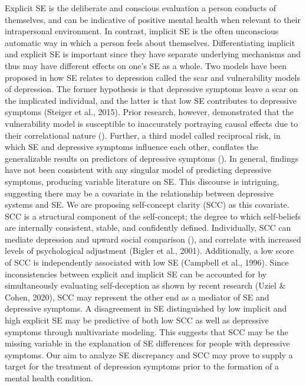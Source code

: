 \documentclass[
  man,
  floatsintext,
  longtable,
  nolmodern,
  notxfonts,
  notimes,
  colorlinks=true,linkcolor=blue,citecolor=blue,urlcolor=blue]{apa7}
\begin{document}
Explicit SE is the deliberate and conscious evaluation a person conducts
of themselves, and can be indicative of positive mental health when
relevant to their intrapersonal environment. In contrast, implicit SE is
the often unconscious automatic way in which a person feels about
themselves. Differentiating implicit and explicit SE is important since
they have separate underlying mechanisms and thus may have different
effects on one's SE as a whole. Two models have been proposed in how SE
relates to depression called the scar and vulnerability models of
depression. The former hypothesis is that depressive symptoms leave a
scar on the implicated individual, and the latter is that low SE
contributes to depressive symptoms (Steiger et al., 2015). Prior
research, however, demonstrated that the vulnerability model is
susceptible to inaccurately portraying causal effects due to their
correlational nature (). Further, a third model called reciprocal risk, in which SE and
depressive symptoms influence each other, conflates the generalizable
results on predictors of depressive symptoms
(). In
general, findings have not been consistent with any singular model of
predicting depressive symptoms, producing variable literature on SE.
This discourse is intriguing, suggesting there may be a covariate in the
relationship between depressive systems and SE. We are proposing
self-concept clarity (SCC) as this covariate. SCC is a structural
component of the self-concept; the degree to which self-beliefs are
internally consistent, stable, and confidently defined. Individually,
SCC can mediate depression and upward social comparison
(), and
correlate with increased levels of psychological adjustment (Bigler et
al., 2001). Additionally, a low score of SCC is independently associated
with low SE (Campbell et al., 1996). Since inconsistencies between
explicit and implicit SE can be accounted for by simultaneously
evaluating self-deception as shown by recent research (Uziel \& Cohen,
2020), SCC may represent the other end as a mediator of SE and
depressive symptoms. A disagreement in SE distinguished by low implicit
and high explicit SE may be predictive of both low SCC as well as
depressive symptoms through multivariate modeling. This suggests that
SCC may be the missing variable in the explanation of SE differences for
people with depressive symptoms. Our aim to analyze SE discrepancy and
SCC may prove to supply a target for the treatment of depression
symptoms prior to the formation of a mental health condition.
\end{document}
